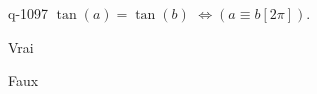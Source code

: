 \begin{truefalse}{q-1097}
$\tan(a)=\tan(b)$  $\Leftrightarrow \left(a\equiv b [2\pi]\right)$.
\item Vrai
\item* Faux
\end{truefalse}

